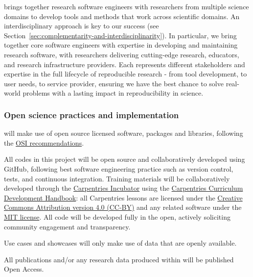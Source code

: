 \TheProject{} brings together research software engineers with researchers from
multiple science domains to develop tools and methods that work across
scientific domains. An interdisciplinary approach is key to our success
(see Section~\ref{sec:complementarity-and-interdisciplinarity}).
In particular, we bring together core software engineers with expertise in developing and maintaining research software,
with researchers delivering cutting-edge research,
educators, and research infrastructure providers.
Each represents different stakeholders and expertise in the full lifecycle of reproducible research - from tool development, to user needs, to service provider,
ensuring we have the best chance to solve real-world problems
with a lasting impact in reproducibility in science.

\subsubsection{Open science practices and implementation}\label{sec:open-science-practices}

\TheProject will make use of open source licensed software, packages and libraries, following the \href{https://opensource.org/licenses}{OSI recommendations}.

All codes in this project will be open source and collaboratively developed using GitHub, following best software engineering practice
such as version control, tests, and continuous integration.
Training materials will be collaboratively developed through the \href{https://carpentries-incubator.org/}{Carpentries Incubator}
using the \href{https://cdh.carpentries.org/}{Carpentries Curriculum Development Handbook}: all Carpentries lessons are licensed under
the \href{https://creativecommons.org/licenses/by/4.0/legalcode}{Creative Commons Attribution version 4.0 (CC-BY)} and any related software under
the \href{https://opensource.org/licenses/MIT}{MIT license}.
All code will be developed fully in the open,
actively soliciting community engagement and transparency.

Use cases and showcases will only make use of data that are openly available.

All publications and/or any research data produced within \TheProject will be published Open Access.


